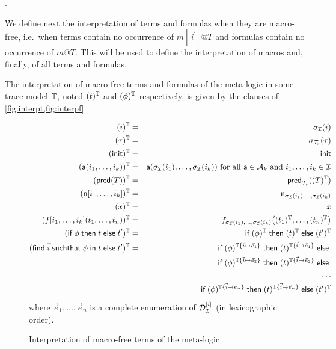 .

We define next the interpretation of terms and formulas when they are
macro-free, i.e.\ when terms contain no occurrence of $m[\vec{i}]@T$
and formulas contain no occurrence of $m@T$. This will be used to
define the interpretation of macros and, finally, of all terms
and formulas.

\begin{definition}
  The interpretation of macro-free terms and formulas of the meta-logic in
  some trace model $\mathbb{T}$, noted $(t)^{\mathbb{T}}$ and $(\phi)^{\mathbb{T}}$
  respectively, is given by the clauses of \cref{fig:interpt,fig:interpf}.
\end{definition}

\begin{figure}[t]
  \begin{eqnarray*}
    (i)^{\mathbb{T}} &=& \sigma_{\mathcal{I}}(i)
    \\
    (\tau)^{\mathbb{T}} &=& \sigma_{\mathcal{T}_s}(\tau) \\
    (\mathsf{init})^{\mathbb{T}} &=& \mathsf{init} \\
    (\textsf{a}(i_1,\ldots,i_k))^{\mathbb{T}} &=&
      \textsf{a}(\sigma_{\mathcal{I}}(i_1),\ldots,\sigma_{\mathcal{I}}(i_k))
      \text{ for all }
      \textsf{a}\in\mathcal{A}_k \text{ and } i_1,\ldots,i_k\in \mathcal{I} \\
    (\textsf{pred}(T))^{\mathbb{T}} &=&
      \mathsf{pred}_{\mathcal{T}_s}((T)^{\mathbb{T}})
    \\
    (\mathsf{n}[i_1,\ldots,i_k])^{\mathbb{T}} &=& \mathsf{n}_{\sigma_{\mathcal{I}}(i_1),\ldots,\sigma_{\mathcal{I}}(i_k)}
    \\
    (x)^{\mathbb{T}} &=& x
    \\
    (f[i_1,\ldots,i_k](t_1,\ldots,t_n))^{\mathbb{T}} &=&
    f_{\sigma_{\mathcal{I}}(i_1),\ldots,\sigma_{\mathcal{I}}(i_k)}\bigl(
      (t_1)^{\mathbb{T}},\ldots,(t_n)^{\mathbb{T}}
    \bigr)
    \\
    (\textsf{if}\; \phi \;\textsf{then}\; t \;\textsf{else}\; t')^{\mathbb{T}} &=&
    \textsf{if}\; (\phi)^{\mathbb{T}} \;\textsf{then}\; (t)^{\mathbb{T}} \;\textsf{else}\; (t')^{\mathbb{T}}
    \\
    (\textsf{find}\; \vec{i} \;\textsf{suchthat}\; \phi \;\textsf{in}\; t \;\textsf{else}\; t')^{\mathbb{T}} &=&
    \textsf{if}\; (\phi)^{\mathbb{T}\{\vec{i}\mapsto\vec{e}_1\}}
    \;\textsf{then}\; (t)^{\mathbb{T}\{\vec{i}\mapsto\vec{e}_1\}}
    \;\textsf{else}\; \\ & &
    \textsf{if}\; (\phi)^{\mathbb{T}\{\vec{i}\mapsto\vec{e}_2\}}
    \;\textsf{then}\; (t)^{\mathbb{T}\{\vec{i}\mapsto\vec{e}_2\}}
    \;\textsf{else}\; \\ & & \ldots \\ & &
    \textsf{if}\; (\phi)^{\mathbb{T}\{\vec{i}\mapsto\vec{e}_{n}\}}
    \;\textsf{then}\; (t)^{\mathbb{T}\{\vec{i}\mapsto\vec{e}_{n}\}}
    \;\textsf{else}\; (t')^{\mathbb{T}}
  \end{eqnarray*}
  where $\vec{e}_1, \ldots, \vec{e}_{n}$ is a complete enumeration
  of $\mathcal{D}_{\mathcal{I}}^{|\vec{i}|}$ (in lexicographic order).
  \caption{Interpretation of macro-free terms of the meta-logic}
  \label{fig:interpt}
\end{figure}

